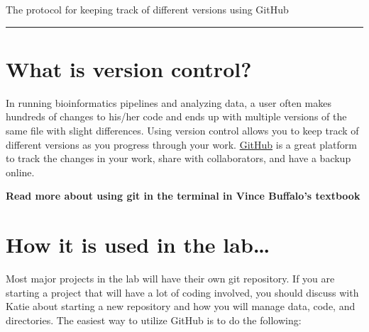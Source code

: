 \documentclass[
  letterpaper,
  DIV=11,
  numbers=noendperiod]{scrreprt}
\begin{document}
The protocol for keeping track of different versions using GitHub

\begin{center}\rule{0.5\linewidth}{0.5pt}\end{center}

\hypertarget{what-is-version-control}{%
\section*{\texorpdfstring{\textbf{What is version
control?}}{What is version control?}}\label{what-is-version-control}}


In running bioinformatics pipelines and analyzing data, a user often
makes hundreds of changes to his/her code and ends up with multiple
versions of the same file with slight differences. Using version control
allows you to keep track of different versions as you progress through
your work. \href{https://github.com/}{GitHub} is a great platform to
track the changes in your work, share with collaborators, and have a
backup online.

\textbf{Read more about using git in the terminal in Vince Buffalo's
textbook}

\hypertarget{how-it-is-used-in-the-lab}{%
\section*{\texorpdfstring{\textbf{How it is used in the
lab\ldots{}}}{How it is used in the lab\ldots{}}}\label{how-it-is-used-in-the-lab}}


Most major projects in the lab will have their own git repository. If
you are starting a project that will have a lot of coding involved, you
should discuss with Katie about starting a new repository and how you
will manage data, code, and directories. The easiest way to utilize
GitHub is to do the following:
\end{document}
